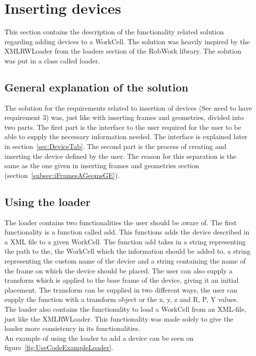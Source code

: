 \section{Inserting devices}
This section contains the description of the functionality related solution regarding adding devices to a WorkCell. The solution was heavily inspired by the XMLRWLoader from the loaders section of the RobWork library. The solution was put in a class called loader.

\subsection{General explanation of the solution}
The solution for the requirements related to insertion of devices (See need to have requirement 3) was, just like with inserting frames and geometries, divided into two parts. The first part is the interface to the user required for the user to be able to supply the necessary information needed. The interface is explained later in section~\ref{sec:DeviceTab}. The second part is the process of creating and inserting the device defined by the user. The reason for this separation is the same as the one given in inserting frames and geometries section (section~\ref{subsec:iFramesAGeomsGE}).

\subsection{Using the loader}
The loader contains two functionalities the user should be aware of. The first functionality is a function called add. This functions adds the device described in a XML file to a given WorkCell. The function add takes in a string representing the path to the, the WorkCell which the information should be added to, a string representing the custom name of the device and a string containing the name of the frame on which the device should be placed. The user can also supply a transform which is applied to the base frame of the device, giving it an initial placement. The transform can be supplied in two different ways, the user can supply the function with a transform object or the x, y, z and R, P, Y values.\\
The loader also contains the functionality to load a WorkCell from an XML-file, just like the XMLRWLoader. This functionality was made solely to give the loader more consistency in its functionalities.\\
An example of using the loader to add a device can be seen on figure~\ref{fig:UseCodeExampleLoader}.

